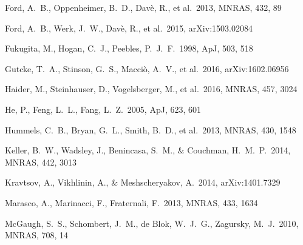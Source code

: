 \documentclass[useAMS,usenatbib]{mn2e}
\def \apj {ApJ}
\def \mnras {MNRAS}
\begin{document}
\begin{thebibliography}{}

    

%
 Ford, A.~B., Oppenheimer, B.~D., Dav{\`e}, R., et al.\ 2013, \mnras, 432, 89

%
 Ford, A.~B., Werk, J.~W., Dav{\`e}, R., et al.\ 2015, arXiv:1503.02084

 Fukugita, M., Hogan, C.~J., Peebles, P.~J.~F.\ 1998, \apj, 503, 518


 Gutcke, T.~A., Stinson, G.~S., Macci{\`o}, A.~V., et al.\ 2016, arXiv:1602.06956



Haider, M., Steinhauser, D., Vogelsberger, M., et al.\ 2016, \mnras, 457, 3024

He, P., Feng, L.~L., Fang, L.~Z.\ 2005, \apj, 623, 601

%
 Hummels, C.~B., Bryan, G.~L., Smith, B.~D., et al.\ 2013, \mnras, 430, 1548




 Keller, B.~W., Wadsley, 
  J., Benincasa, S.~M., \& Couchman, H.~M.~P.\ 2014, \mnras, 442, 3013

 Kravtsov, A., 
Vikhlinin, A., \& Meshscheryakov, A.\ 2014, arXiv:1401.7329 

  



Marasco, A., Marinacci, F., Fraternali, F.\ 2013, \mnras, 433, 1634

 McGaugh, S.~S., 
Schombert, J.~M., de Blok, W.~J.~G., Zagursky, M.~J.\ 2010, \mnras,
708, 14


\end{thebibliography}
\end{document}
